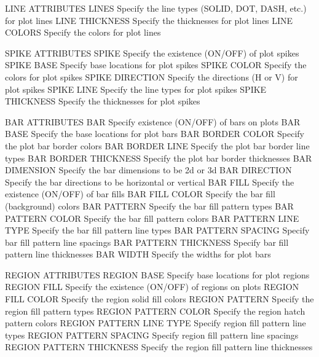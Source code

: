 LINE ATTRIBUTES
   LINES                      Specify the line types (SOLID, DOT, DASH,
                              etc.) for plot lines
   LINE THICKNESS             Specify the thicknesses for plot lines
   LINE COLORS                Specify the colors for plot lines
 
SPIKE ATTRIBUTES
   SPIKE                      Specify the existence (ON/OFF) of plot
                              spikes
   SPIKE BASE                 Specify base locations for plot spikes
   SPIKE COLOR                Specify the colors for plot spikes
   SPIKE DIRECTION            Specify the directions (H or V) for plot
                              spikes
   SPIKE LINE                 Specify the line types for plot spikes
   SPIKE THICKNESS            Specify the thicknesses for plot spikes
 
BAR ATTRIBUTES
   BAR                        Specify existence (ON/OFF) of bars on plots
   BAR BASE                   Specify the base locations for plot bars
   BAR BORDER COLOR           Specify the plot bar border colors
   BAR BORDER LINE            Specify the plot bar border line types
   BAR BORDER THICKNESS       Specify the plot bar border thicknesses
   BAR DIMENSION              Specify the bar dimensions to be 2d or 3d
   BAR DIRECTION              Specify the bar directions to be
                              horizontal or vertical
   BAR FILL                   Specify the existence (ON/OFF) of bar
                              fills
   BAR FILL COLOR             Specify the bar fill (background) colors
   BAR PATTERN                Specify the bar fill pattern types
   BAR PATTERN COLOR          Specify the bar fill pattern colors
   BAR PATTERN LINE TYPE      Specify the bar fill pattern line types
   BAR PATTERN SPACING        Specify bar fill pattern line spacings
   BAR PATTERN THICKNESS      Specify bar fill pattern line thicknesses
   BAR WIDTH                  Specify the widths for plot bars
 
REGION ATTRIBUTES
   REGION BASE                Specify base locations for plot regions
   REGION FILL                Specify the existence (ON/OFF) of
                              regions on plots
   REGION FILL COLOR          Specify the region solid fill colors
   REGION PATTERN             Specify the region fill pattern types
   REGION PATTERN COLOR       Specify the region hatch pattern colors
   REGION PATTERN LINE TYPE   Specify region fill pattern line types
   REGION PATTERN SPACING     Specify region fill pattern line spacings
   REGION PATTERN THICKNESS   Specify the region fill pattern line
                              thicknesses
 
